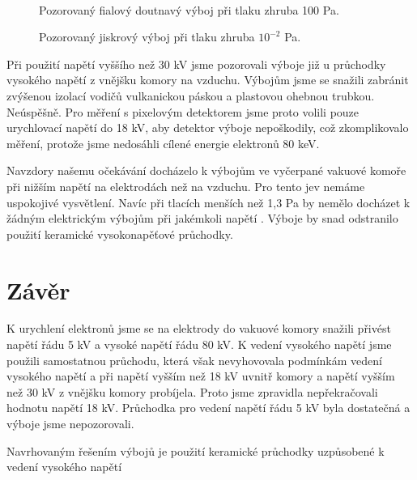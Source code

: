 \begin{figure}[h!]
\begin{minipage}[c]{200pt}
\end{minipage}
\\
\begin{minipage}[c]{200pt}
\caption[Pozorovaný doutnavý výboj]{Pozorovaný fialový doutnavý výboj při tlaku zhruba 100 Pa.  }
\label{obr:fialovy_vyboj}
\end{minipage}
\begin{minipage}[c]{5pt}
\end{minipage}
\begin{minipage}[c]{200pt}
\caption[Pozorovaný jiskrový výboj]{Pozorovaný jiskrový výboj při tlaku zhruba $10^{-2}$ Pa.}
\label{obr:jiskra}
\end{minipage}
\end{figure}


\par Při použití napětí vyššího než 30 kV jsme pozorovali výboje již u průchodky vysokého napětí z vnějšku komory na vzduchu. Výbojům jsme se snažili zabránit zvýšenou izolací vodičů vulkanickou páskou a plastovou ohebnou trubkou. Neúspěšně. Pro měření s pixelovým detektorem jsme proto volili pouze urychlovací napětí do 18 kV, aby detektor výboje nepoškodily, což zkomplikovalo měření, protože jsme nedosáhli cílené energie elektronů 80 keV.
\par Navzdory našemu očekávání docházelo k výbojům ve vyčerpané vakuové komoře při nižším napětí na elektrodách než na vzduchu. Pro tento jev nemáme uspokojivé vysvětlení. Navíc při tlacích menších než 1,3 Pa by nemělo docházet k žádným elektrickým výbojům při jakémkoli napětí \cite{ellion}. Výboje by snad odstranilo použití keramické vysokonapěťové průchodky.



\section{Závěr}
\par K urychlení elektronů jsme se na elektrody do vakuové komory snažili přivést napětí řádu 5 kV a vysoké napětí řádu 80 kV. K vedení vysokého napětí jsme použili samostatnou průchodu, která však nevyhovovala podmínkám vedení vysokého napětí a při napětí vyšším než 18 kV uvnitř komory a napětí vyšším než 30 kV z vnějšku komory probíjela. Proto jsme zpravidla nepřekračovali hodnotu napětí 18 kV. Průchodka pro vedení napětí řádu 5 kV byla dostatečná a výboje jsme nepozorovali.
\par Navrhovaným řešením výbojů je použití keramické průchodky uzpůsobené k vedení vysokého napětí
